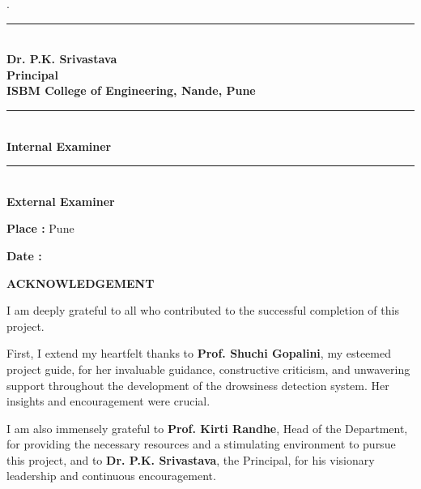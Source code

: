 \documentclass[12pt]{article}
\begin{document}
\begin{titlepage}
\vspace{1.5 cm}
\begin{center}
.\begin{minipage}[t]{0.8\textwidth}
    \centering
    \rule{4.2cm}{1pt}\\
\textbf {Dr. P.K. Srivastava}\\
    \textbf {Principal}\\
\textbf{ISBM College of Engineering, Nande, Pune }
\end{minipage}
\end{center}

\vspace{1.5 cm}
\begin{minipage}[t]{0.3\textwidth}
    \centering
    \rule{4cm}{1pt}\\
\textbf {Internal Examiner}\\
\end{minipage}
\hfill
\begin{minipage}[t]{0.3\textwidth}
    \centering
    \rule{4cm}{1pt}\\
 \textbf {External Examiner}\\
\end{minipage}
\vspace{1 cm}

\textbf{Place : }
Pune

\textbf{Date :}

\end{titlepage}

\newpage
\begin{center}
\Large
\textbf{ACKNOWLEDGEMENT }\\
 \end{center}
\vspace{1cm}
\normalsize

I am deeply grateful to all who contributed to the successful completion of this project. 

First, I extend my heartfelt thanks to \textbf{Prof. Shuchi Gopalini}, my esteemed project guide, for her invaluable guidance, constructive criticism, and unwavering support throughout the development of the drowsiness detection system. Her insights and encouragement were crucial.

I am also immensely grateful to \textbf{Prof. Kirti Randhe}, Head of the Department, for providing the necessary resources and a stimulating environment to pursue this project, and to \textbf{Dr. P.K. Srivastava}, the Principal, for his visionary leadership and continuous encouragement.
\end{document}
